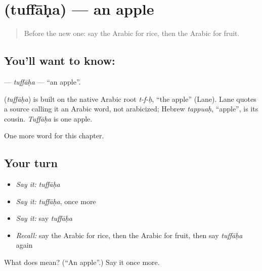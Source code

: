 \section[\texorpdfstring{\ar{تفاحة} (tuffāḥa)}{تفاحة (tuffāḥa)}]{ (tuffāḥa) — an apple}

\label{lesson:AR-C66-tuffaha}



\begin{quote}
Before the new one: say the Arabic for rice, then the Arabic for fruit.
\end{quote}

\subsection*{You'll want to know: }
\textbf{} — \emph{tuffāḥa} — \textquotedblleft{}an apple\textquotedblright{}.

\begin{cousinweb}
\textbf{} (\emph{tuffāḥa}) is built on the native Arabic root \emph{t-f-ḥ}, \textquotedblleft{}the apple\textquotedblright{} (Lane). Lane quotes a source calling it an Arabic word, not arabicized; Hebrew \emph{tappuaḥ}, \textquotedblleft{}apple\textquotedblright{}, is its cousin. \emph{Tuffāḥa} is one apple.
\end{cousinweb}

\begin{grammarlens}[title={What you've built}]
One more word for this chapter.
\end{grammarlens}

\subsection*{Your turn}
\begin{itemize}
\raggedright
  \item \emph{Say it:} \emph{tuffāḥa}
  \item \emph{Say it:} \emph{tuffāḥa}, once more
  \item \emph{Say it:} say \emph{tuffāḥa}
  \item \emph{Recall:} say the Arabic for rice, then the Arabic for fruit, then say \emph{tuffāḥa} again
\end{itemize}

\begin{tcolorbox}[breakable,colback=teal!4,colframe=teal!35!black,title={Before you move on}]
What does  mean? (\textquotedblleft{}An apple\textquotedblright{}.) Say it once more.
\end{tcolorbox}
